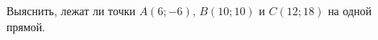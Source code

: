 \begin{ex}
	\begin{condition}
		Выяснить, лежат ли точки \( A(6;-6) \), \( B(10;10) \) и \( C(12;18) \) на одной прямой.
	\end{condition}
\end{ex}